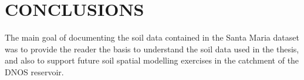 
\section{CONCLUSIONS}

The main goal of documenting the soil data contained in the Santa Maria dataset was to provide the reader the 
basis to understand the soil data used in the thesis, and also to support future soil spatial modelling 
exercises in 
the catchment of the DNOS reservoir.

